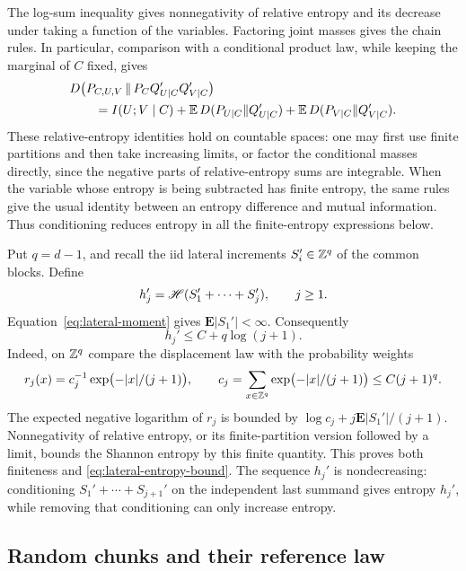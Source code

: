 The log-sum inequality gives nonnegativity of relative entropy and its
decrease under taking a function of the variables.  Factoring joint masses
gives the chain rules.  In particular, comparison with a conditional product
law, while keeping the marginal of \(C\) fixed, gives
\begin{align}
 &D\bigl(P_{C,U,V}\,\Vert\,
          P_C Q'_{U\mid C}Q'_{V\mid C}\bigr)\notag\\
 &\qquad=I(U;V\mid C)
   +\mathbb E\,D(P_{U\mid C}\Vert Q'_{U\mid C})
   +\mathbb E\,D(P_{V\mid C}\Vert Q'_{V\mid C}).
 \label{eq:conditional-product-entropy}
\end{align}
These relative-entropy identities hold on countable spaces: one may first
use finite partitions and then take increasing limits, or factor the
conditional masses directly, since the negative parts of relative-entropy
sums are integrable.  When the variable whose entropy is being subtracted
has finite entropy, the same rules give the usual identity between an
entropy difference and mutual information.  Thus conditioning reduces
entropy in all the finite-entropy expressions below.

Put \(q=d-1\), and recall the iid lateral increments \(S_i'\in\mathbb Z^q\) of
the common blocks.  Define
\[
 h_j'=\mathscr H(S_1'+\cdots+S_j'),\qquad j\ge1.
\]
Equation~\eqref{eq:lateral-moment} gives \(\mathbf E|S_1'|<\infty\).
Consequently
\begin{equation}
 h_j'\le C+q\log(j+1).
 \label{eq:lateral-entropy-bound}
\end{equation}
Indeed, on \(\mathbb Z^q\) compare the displacement law with the probability
weights
\[
 r_j(x)=c_j^{-1}\exp\bigl(-|x|/(j+1)\bigr),
 \qquad
 c_j=\sum_{x\in\mathbb Z^q}\exp\bigl(-|x|/(j+1)\bigr)
       \le C(j+1)^q.
\]
The expected negative logarithm of \(r_j\) is bounded by
\(\log c_j+j\mathbf E|S_1'|/(j+1)\).  Nonnegativity of relative entropy,
or its finite-partition version followed by a limit, bounds the Shannon
entropy by this finite quantity.  This proves both finiteness and
\eqref{eq:lateral-entropy-bound}.  The sequence \(h_j'\) is nondecreasing:
conditioning \(S_1'+\cdots+S_{j+1}'\) on the independent last summand
gives entropy \(h_j'\), while removing that conditioning can only increase
entropy.

\subsection{Random chunks and their reference law}

